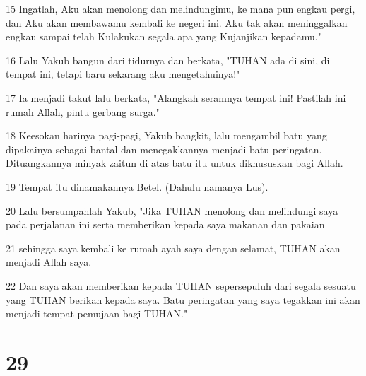 \par 15 Ingatlah, Aku akan menolong dan melindungimu, ke mana pun engkau pergi, dan Aku akan membawamu kembali ke negeri ini. Aku tak akan meninggalkan engkau sampai telah Kulakukan segala apa yang Kujanjikan kepadamu."
\par 16 Lalu Yakub bangun dari tidurnya dan berkata, "TUHAN ada di sini, di tempat ini, tetapi baru sekarang aku mengetahuinya!"
\par 17 Ia menjadi takut lalu berkata, "Alangkah seramnya tempat ini! Pastilah ini rumah Allah, pintu gerbang surga."
\par 18 Keesokan harinya pagi-pagi, Yakub bangkit, lalu mengambil batu yang dipakainya sebagai bantal dan menegakkannya menjadi batu peringatan. Dituangkannya minyak zaitun di atas batu itu untuk dikhususkan bagi Allah.
\par 19 Tempat itu dinamakannya Betel. (Dahulu namanya Lus).
\par 20 Lalu bersumpahlah Yakub, "Jika TUHAN menolong dan melindungi saya pada perjalanan ini serta memberikan kepada saya makanan dan pakaian
\par 21 sehingga saya kembali ke rumah ayah saya dengan selamat, TUHAN akan menjadi Allah saya.
\par 22 Dan saya akan memberikan kepada TUHAN sepersepuluh dari segala sesuatu yang TUHAN berikan kepada saya. Batu peringatan yang saya tegakkan ini akan menjadi tempat pemujaan bagi TUHAN."

\chapter{29}

